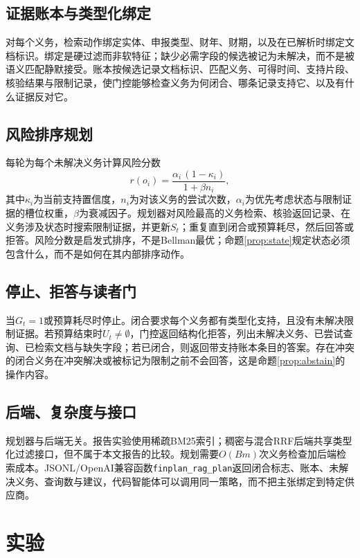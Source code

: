 \documentclass[10.5pt,a4paper]{ctexart}
\begin{document}
\subsection{证据账本与类型化绑定}
对每个义务，检索动作绑定实体、申报类型、财年、财期，以及在已解析时绑定文档标识。绑定是硬过滤而非软特征；缺少必需字段的候选被记为未解决，而不是被语义匹配静默接受。账本按候选记录文档标识、匹配义务、可得时间、支持片段、核验结果与限制记录，使门控能够检查义务为何闭合、哪条记录支持它、以及有什么证据反对它。

\subsection{风险排序规划}
每轮为每个未解决义务计算风险分数
\begin{equation}
r(o_i)=\frac{\alpha_i\,(1-\kappa_i)}{1+\beta n_i},
\end{equation}
其中$\kappa_i$为当前支持置信度，$n_i$为对该义务的尝试次数，$\alpha_i$为优先考虑状态与限制证据的槽位权重，$\beta$为衰减因子。规划器对风险最高的义务检索、核验返回记录、在义务涉及状态时搜索限制证据，并更新$S_t$；重复直到闭合或预算耗尽，然后回答或拒答。风险分数是启发式排序，不是Bellman最优；命题\ref{prop:state}规定状态必须包含什么，而不是如何在其内部排序动作。

\subsection{停止、拒答与读者门}
当$G_t=1$或预算耗尽时停止。闭合要求每个义务都有类型化支持，且没有未解决限制证据。若预算结束时$U_t\neq\emptyset$，门控返回结构化拒答，列出未解决义务、已尝试查询、已检索文档与缺失字段；若已闭合，则返回带支持账本条目的答案。存在冲突的闭合义务在冲突解决或被标记为限制之前不会回答，这是命题\ref{prop:abstain}的操作内容。

\subsection{后端、复杂度与接口}
规划器与后端无关。报告实验使用稀疏BM25索引\citep{robertson2009bm25}；稠密\citep{karpukhin2020dpr}与混合RRF\citep{cormack2009rrf}后端共享类型化过滤接口，但不属于本文报告的比较。规划需要$O(Bm)$次义务检查加后端检索成本。JSONL/OpenAI兼容函数\texttt{finplan\_rag\_plan}返回闭合标志、账本、未解决义务、查询数与建议，代码智能体可以调用同一策略，而不把主张绑定到特定供应商。

\section{实验}
\label{sec:experiments}
\end{document}
